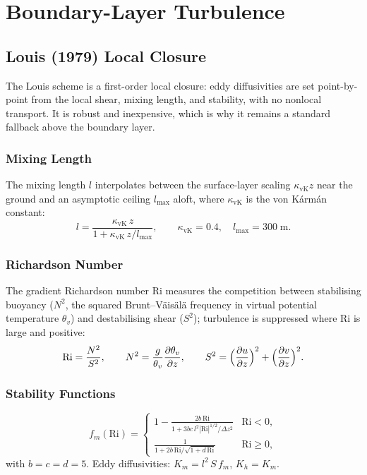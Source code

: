 \documentclass[11pt,twoside]{report}
\newcommand{\pp}{\partial}
\begin{document}
\section{Boundary-Layer Turbulence}
\label{sec:pbl}

\subsection{Louis (1979) Local Closure}

The Louis scheme \citep{Louis1979} is a first-order local closure: eddy
diffusivities are set point-by-point from the local shear, mixing length, and
stability, with no nonlocal transport. It is robust and inexpensive, which is
why it remains a standard fallback above the boundary layer.

\subsubsection{Mixing Length}

The mixing length $l$ interpolates between the surface-layer scaling
$\kappa_{\mathrm{vK}}z$ near the ground and an asymptotic ceiling $l_{\max}$
aloft, where $\kappa_{\mathrm{vK}}$ is the von K\'arm\'an constant:
\begin{equation}
  l = \frac{\kappa_{\mathrm{vK}}\,z}{1+\kappa_{\mathrm{vK}}\,z/l_{\max}},
  \qquad \kappa_{\mathrm{vK}}=0.4,\quad l_{\max}=300\;\text{m}.
\end{equation}

\subsubsection{Richardson Number}

The gradient Richardson number $\mathrm{Ri}$ measures the competition between
stabilising buoyancy ($N^2$, the squared Brunt--V\"ais\"al\"a frequency in
virtual potential temperature $\theta_v$) and destabilising shear ($S^2$);
turbulence is suppressed where $\mathrm{Ri}$ is large and positive:
\begin{equation}
  \mathrm{Ri} = \frac{N^2}{S^2}, \qquad
  N^2 = \frac{g}{\theta_v}\frac{\pp\theta_v}{\pp z}, \qquad
  S^2 = \Bigl(\frac{\pp u}{\pp z}\Bigr)^2
  +\Bigl(\frac{\pp v}{\pp z}\Bigr)^2.
\end{equation}

\subsubsection{Stability Functions}
\begin{equation}
  f_m(\mathrm{Ri}) = \begin{cases}
    \displaystyle 1-\frac{2b\,\mathrm{Ri}}
    {1+3bc\,l^2|\mathrm{Ri}|^{1/2}/\Delta z^2} & \mathrm{Ri}<0,\\[8pt]
    \displaystyle \frac{1}{1+2b\,\mathrm{Ri}/\sqrt{1+d\,\mathrm{Ri}}}
    & \mathrm{Ri}\ge 0,
  \end{cases}
\end{equation}
with $b=c=d=5$.  Eddy diffusivities: $K_m=l^2\,S\,f_m$, $K_h=K_m$.
\end{document}
